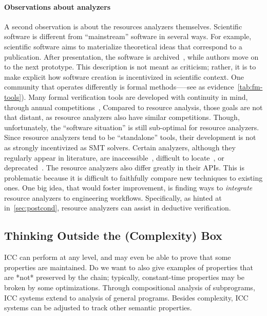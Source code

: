 \paragraph*{Observations about analyzers}
A second observation is about the resources analyzers themselves.
Scientific software is different from \enquote{mainstream} software in several ways.
For example, scientific software aims to materialize theoretical ideas that correspond to a publication.
After presentation, the software is archived~\cite{acm_badging}, while authors move on to the next prototype.
This description is not meant as criticism;
rather, it is to make explicit how software creation is incentivized in scientific context.
One community that operates differently is formal methods—--see as evidence~\autoref{tab:fm-tools}).
Many formal verification tools are developed with continuity in mind, through annual competitions~\cite{casc,beyer2022}, \etc
Compared to resource analysis, those goals are not that distant, as resource analyzers also have similar competitions.
Though, unfortunately, the \enquote{software situation} is still sub-optimal for resource analyzers.
Since resource analyzers tend to be \enquote{standalone} tools, their development is not as strongly incentivized as \eg SMT solvers.
Certain analyzers, although they regularly appear in literature, are inaccessible~\cite{sinn2017}, difficult to locate~\cite{carbonneaux2015},
or deprecated~\cite{gulwani2009,srikanth2017}.
The resource analyzers also differ greatly in their APIs.
This is problematic because it is difficult to faithfully compare new techniques to existing ones.
One big idea, that would foster improvement, is finding ways to \emph{integrate} resource analyzers to engineering workflows.
Specifically, as hinted at in~\autoref{sec:postcond}, resource analyzers can assist in deductive verification.

\subsection{Thinking Outside the (Complexity) Box}
\label{subsec:res-other-props}

ICC can perform at any level, and may even be able to prove that some properties are maintained.
Do we want to also give examples of properties that are *not* preserved by the chain;
typically, constant-time properties may be broken by some optimizations.
Through compositional analysis of subprograms, ICC systems extend to analysis of general programs.
Besides complexity, ICC systems can be adjusted to track other semantic properties.

